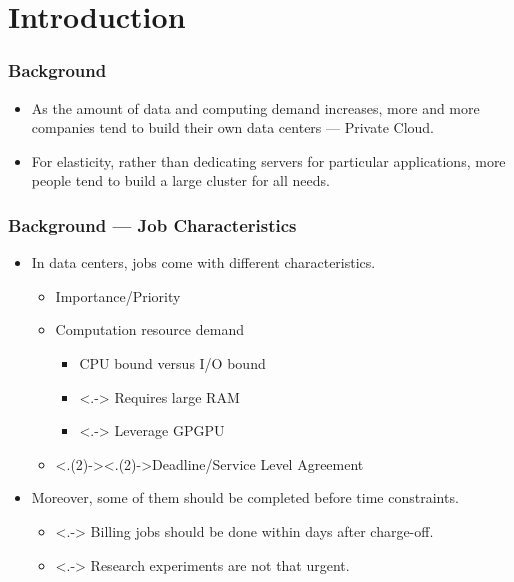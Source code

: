 \section{Introduction}

\begin{frame}
  \frametitle{Background}
  \begin{itemize}[<+->]
    \item As the amount of data and computing demand increases, more and
      more companies tend to build their own data centers --- Private
      Cloud.
    \item For elasticity, rather than dedicating servers for particular
      applications, more people tend to build a large cluster for all
      needs.
  \end{itemize}
\end{frame}
\begin{frame}
  \frametitle{Background --- Job Characteristics}
  \begin{itemize}[<+->]
    \item In data centers, jobs come with different characteristics.
      \begin{itemize}
        \item Importance/Priority
        \item Computation resource demand
          \begin{itemize}
            \item CPU bound versus I/O bound
            \item <.-> Requires large RAM
            \item <.-> Leverage GPGPU
          \end{itemize}
        \item <.(2)->{\alert<.(2)->{Deadline/Service Level Agreement}}
      \end{itemize}
    \item Moreover, some of them should be completed before time
      constraints.
      \begin{itemize}
        \item <.-> Billing jobs should be done within days after
          charge-off.
        \item <.-> Research experiments are not that urgent.
      \end{itemize}
  \end{itemize}
\end{frame}

